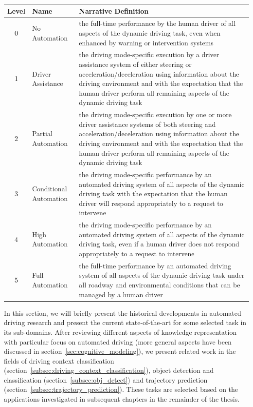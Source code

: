 \begin{center}
	\begin{tabular}{|c | l | p{10cm}|}
		\hline
		\textbf{Level} & \textbf{Name} & \textbf{Narrative Definition}\\ \hline
		0 & No Automation & the full-time performance by the human driver of all aspects of the dynamic driving task, even when enhanced by warning or intervention systems \\ \hline
		1 & Driver Assistance & the driving mode-specific execution by a driver assistance system of either steering or acceleration/deceleration using information about the driving environment and with the expectation that the human driver perform all remaining aspects of the dynamic driving task \\ \hline
		2 & Partial Automation & the driving mode-specific execution by one or more driver assistance systems of both steering and acceleration/deceleration using information	 about the driving environment and with the expectation that the human driver perform all remaining aspects of the dynamic driving task \\ \hline
		3 & Conditional Automation &  the driving mode-specific performance by an automated driving system of all aspects of the dynamic driving task with the expectation that the human driver will respond appropriately to a request to intervene \\ \hline
		4 & High Automation & the driving mode-specific performance by an automated driving system of all aspects of the dynamic driving task, even if a human driver does not respond appropriately to a request to intervene \\ \hline
		5 & Full Automation & the full-time performance by an automated driving system of all aspects of the dynamic driving task under all roadway and environmental conditions that can be managed by a human driver \\ \hline
	\end{tabular}
	\label{tab:autonomy_levels}
\end{center}

In this section, we will briefly present the historical developments in automated driving research and present the current state-of-the-art for some selected task in its sub-domains.
After reviewing different aspects of knowledge representation with particular focus on automated driving (more general aspects have been discussed in section~\ref{sec:cognitive_modeling}), we present related work in the fields of driving context classification (section~\ref{subsec:driving_context_classification}), object detection and classification (section~\ref{subsec:obj_detect}) and trajectory prediction (section~\ref{subsec:trajectory_prediction}). 
These tasks are selected based on the applications investigated in subsequent chapters in the remainder of the thesis.

